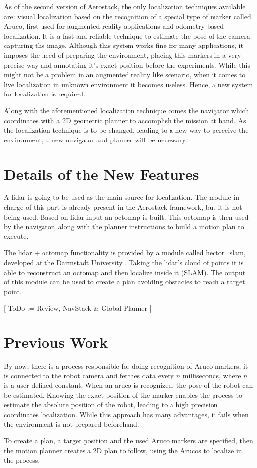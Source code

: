     As of the second version of Aerostack, the only localization techniques available are: visual localization based on the recognition of a special type of marker called Aruco, first used for augmented reality applications and odometry based localization. It is a fast and reliable technique to estimate the pose of the camera capturing the image. Although this system works fine for many applications, it imposes the need of preparing the environment, placing this markers in a very precise way and annotating it's exact position before the experiments. While this might not be a problem in an augmented reality like scenario, when it comes to live localization in unknown environment it becomes useless. Hence, a new system for localization is required.

    Along with the aforementioned localization technique comes the navigator which coordinates with a 2D geometric planner to accomplish the mission at hand. As the localization technique is to be changed, leading to a new way to perceive the environment, a new navigator and planner will be necessary. 

  \section{Details of the New Features} \label{ch_2:sect:improvements}

    A lidar is going to be used as the main source for localization. The module in charge of this part is already present in the Aerostack framework, but it is not being used. Based on lidar input an octomap is built. This octomap is then used by the navigator, along with the planner instructions to build a motion plan to execute.

    The lidar + octomap functionality is provided by a module called hector\_slam, developed at the Darmstadt University \cite{hector_slam}. Taking the lidar's cloud of points it is able to reconstruct an octomap and then localize inside it (SLAM). The output of this module can be used to create a plan avoiding obstacles to reach a target point.

    [ ToDo := Review, NavStack \& Global Planner ]

  \section{Previous Work} \label{ch_2:sect:previous_work}

    By now, there is a process responsible for doing recognition of Aruco markers, it is connected to the robot camera and fetches data every $n$ milliseconds, where $n$ is a user defined constant. When an aruco is recognized, the pose of the robot can be estimated. Knowing the exact position of the marker enables the process to estimate the absolute position of the robot, leading to a high precision coordinates localization. While this approach has many advantages, it fails when the environment is not prepared beforehand.

    To create a plan, a target position and the used Aruco markers are specified, then the motion planner creates a 2D plan to follow, using the Arucos to localize in the process.

    \begin{comment}
      \begin{itemize}
      \end{itemize}
    \end{comment}

